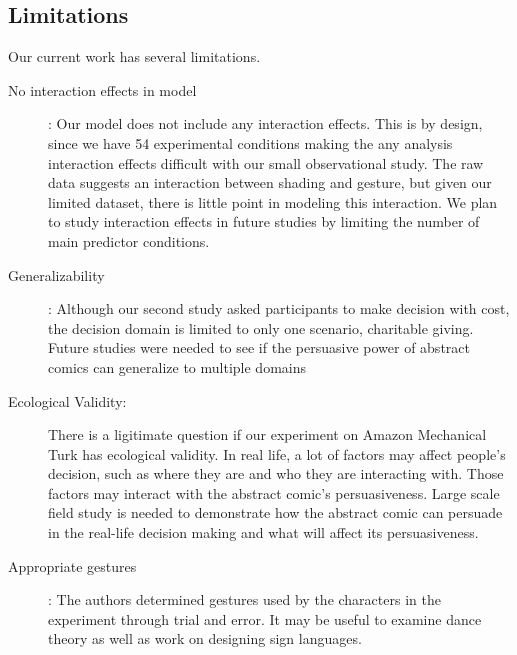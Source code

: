 \subsection{Limitations}
Our current work has several limitations.
\begin{description}
 \item[No interaction effects in model]: Our model does not include any interaction effects. This is by design, since we have 54 experimental conditions making the any analysis interaction effects difficult with our small observational study. The raw data suggests an interaction between shading and gesture, but given our limited dataset, there is little point in modeling this interaction. We plan to study interaction effects in future studies by limiting the number of main predictor conditions.
 \item[Generalizability]:  Although our second study asked participants to make decision with cost, the decision domain is limited to only one scenario, charitable giving. Future studies were needed to see if the persuasive power of abstract comics can generalize to multiple domains

 \item[Ecological Validity:] There is a ligitimate question if our experiment on Amazon Mechanical Turk has ecological validity. In real life, a lot of factors may affect people's decision, such as where they are and who they are interacting with. Those factors may interact with the abstract comic's persuasiveness. Large scale field study is needed to demonstrate how the abstract comic can persuade in the real-life decision making and what will affect its persuasiveness. 
 \item[Appropriate gestures]: The authors determined gestures used by the characters in the experiment through trial and error. It may be useful to examine dance theory as well as work on designing sign languages.
\end{description}
